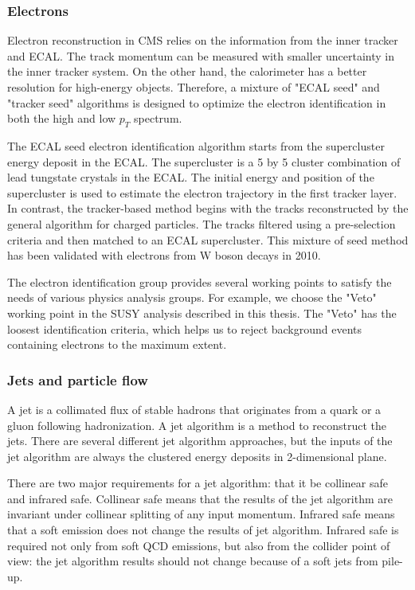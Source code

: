 \subsubsection{Electrons}
Electron reconstruction in CMS relies on the information from the inner tracker and ECAL. The track momentum can be measured with smaller uncertainty in the inner tracker system. On the other hand, the calorimeter has a better resolution for high-energy objects. Therefore, a mixture of "ECAL seed" and "tracker seed" algorithms is designed to optimize the electron identification in both the high and low $p_{T}$ spectrum. 

The ECAL seed electron identification algorithm starts from the supercluster energy deposit in the ECAL. The supercluster is a 5 by 5 cluster combination of lead tungstate crystals in the ECAL. The initial energy and position of the supercluster is used to estimate the electron trajectory in the first tracker layer. In contrast, the tracker-based method begins with the tracks reconstructed by the general algorithm for charged particles. The tracks filtered using a pre-selection criteria and then matched to an ECAL supercluster. This mixture of seed method has been validated with electrons from W boson decays in 2010\cite{Khachatryan:2015hwa}. 

The electron identification group provides several working points to satisfy the needs of various physics analysis groups. For example, we choose the "Veto" working point in the SUSY analysis described in this thesis. The "Veto" has the loosest identification criteria, which helps us to reject background events containing electrons to the maximum extent. 
\subsubsection{Jets and particle flow}

A jet is a collimated flux of stable hadrons that originates from a quark or a gluon following hadronization. A jet algorithm is a method to reconstruct the jets. There are several different jet algorithm approaches, but the inputs of the jet algorithm are always the clustered energy deposits in 2-dimensional plane. 

There are two major requirements for a jet algorithm: that it be collinear safe and infrared safe. Collinear safe means that the results of the jet algorithm are invariant under collinear splitting of any input momentum. Infrared safe means that a soft emission does not change the results of jet algorithm. Infrared safe is required not only from soft QCD emissions, but also from the collider point of view: the jet algorithm results should not change because of a soft jets from pile-up. 

